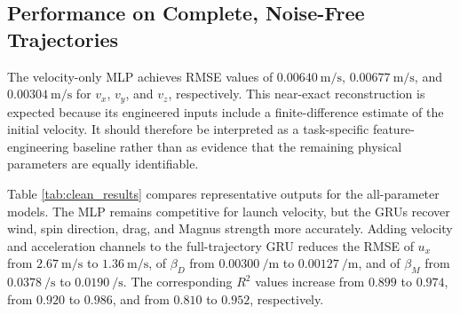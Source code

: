 \subsection{Performance on Complete, Noise-Free Trajectories}

The velocity-only MLP achieves RMSE values of
$\SI{0.00640}{\meter\per\second}$,
$\SI{0.00677}{\meter\per\second}$, and
$\SI{0.00304}{\meter\per\second}$
for $v_x$, $v_y$, and $v_z$, respectively. This near-exact reconstruction is expected because its engineered inputs include a finite-difference estimate of the initial velocity. It should therefore be interpreted as a task-specific feature-engineering baseline rather than as evidence that the remaining physical parameters are equally identifiable.

Table \ref{tab:clean_results} compares representative outputs for the all-parameter models.
The MLP remains competitive for launch velocity, but the GRUs recover wind, spin direction, drag, and Magnus strength more accurately. Adding velocity and acceleration channels to the full-trajectory GRU reduces the RMSE of $u_x$ from
$\SI{2.67}{\meter\per\second}$ to $\SI{1.36}{\meter\per\second}$, of $\beta_D$ from
$\SI{0.00300}{\per\meter}$ to $\SI{0.00127}{\per\meter}$, and of $\beta_M$ from
$\SI{0.0378}{\per\second}$ to $\SI{0.0190}{\per\second}$.
The corresponding $R^2$ values increase from $0.899$ to $0.974$, from $0.920$ to $0.986$, and from $0.810$ to $0.952$, respectively.

\begin{table}[htbp]
    \centering
    \small
    \caption{Per-target test performance on complete, noise-free trajectories. Each entry reports RMSE followed by $R^2$ in parentheses. Model names correspond to configurations 02, 03, 04, and 06 in Table~\ref{tab:model_configurations}.}
    \label{tab:clean_results}
\end{table}

